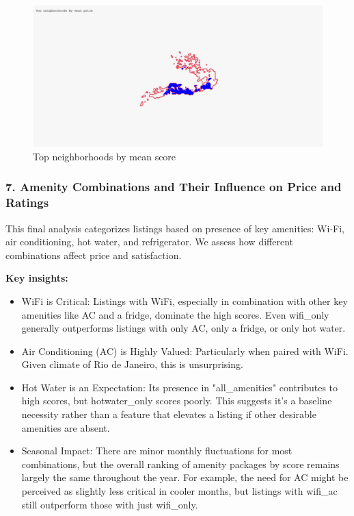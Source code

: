 \vspace{1em}
\begin{figure}[H]
    \centering
    \includegraphics[width=1\textwidth]{images/q6_4.jpg}
    \caption{Top neighborhoods by mean score}
    \label{fig:figureq14}
\end{figure}

\subsubsection*{7. Amenity Combinations and Their Influence on Price and Ratings}

This final analysis categorizes listings based on presence of key amenities: Wi-Fi, air conditioning, hot water, and refrigerator. We assess how different combinations affect price and satisfaction.

\vspace{0.5em}
\textbf{Key insights:}
\begin{itemize}
    \item WiFi is Critical: Listings with WiFi, especially in combination with other key amenities like AC and a fridge, dominate the high scores. Even wifi\_only generally outperforms listings with only AC, only a fridge, or only hot water.
    \item Air Conditioning (AC) is Highly Valued: Particularly when paired with WiFi. Given climate of Rio de Janeiro, this is unsurprising.
    \item Hot Water is an Expectation: Its presence in "all\_amenities" contributes to high scores, but hotwater\_only scores poorly. This suggests it's a baseline necessity rather than a feature that elevates a listing if other desirable amenities are absent.
    \item Seasonal Impact: There are minor monthly fluctuations for most combinations, but the overall ranking of amenity packages by score remains largely the same throughout the year. For example, the need for AC might be perceived as slightly less critical in cooler months, but listings with wifi\_ac still outperform those with just wifi\_only.
\end{itemize}

